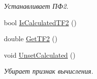 \begin{DoxyCompactItemize}
\begin{DoxyCompactList}\small\item\em Устанавливает ПФ2. \item\end{DoxyCompactList}\item 
bool \hyperlink{struct_t_f_a866d2d362fe752881032dda5d778e2dd}{IsCalculatedTF2} ()
\item 
double \hyperlink{struct_t_f_af4d4a61cabe37ffacde3f69fe7c9f4e4}{GetTF2} ()
\item 
\hypertarget{struct_t_f_a5d6c77a89c681d80ce6e0a412f0cd16a}{
void \hyperlink{struct_t_f_a5d6c77a89c681d80ce6e0a412f0cd16a}{UnsetCalculated} ()}
\label{struct_t_f_a5d6c77a89c681d80ce6e0a412f0cd16a}

\begin{DoxyCompactList}\small\item\em Убирает признак вычисления. \item\end{DoxyCompactList}\end{DoxyCompactItemize}


